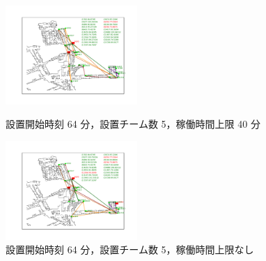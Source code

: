 \documentclass[a4paper,12pt,fleqn]{jarticle}
\begin{document}
\begin{figure}
 \begin{center}
  \begin{minipage}{0.49\hsize}
   \begin{center}
    \includegraphics[width=5cm,trim=100 50 100 50]{fig/64min_5team_lim40min.pdf}
    \caption{設置開始時刻 64 分，\newline \quad 設置チーム数 5，稼働時間上限 40 分}
    \label{fig:64min_5team_lim40min}
   \end{center}
  \end{minipage}
  \begin{minipage}{0.49\hsize}
   \begin{center}
    \includegraphics[width=5cm,trim=100 50 100 50]{fig/64min_5team_nolim.pdf}
    \caption{設置開始時刻 64 分，\newline \quad 設置チーム数 5，稼働時間上限なし}
    \label{fig:64min_5team_nolim}
   \end{center}
  \end{minipage}
 \end{center}
\end{figure}
\end{document}
